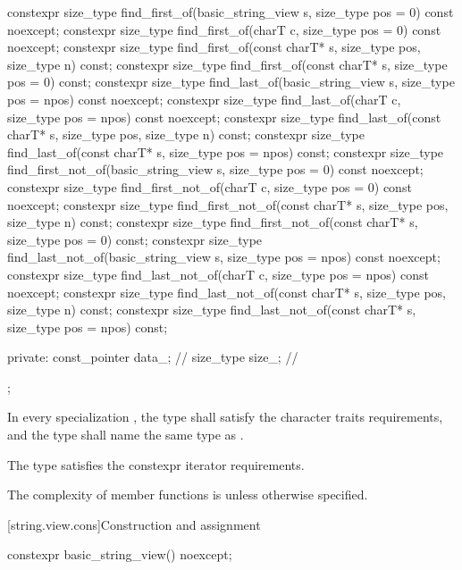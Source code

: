 \begin{codeblock}
{  constexpr size_type find_first_of(basic_string_view s, size_type pos = 0) const noexcept;
  constexpr size_type find_first_of(charT c, size_type pos = 0) const noexcept;
  constexpr size_type find_first_of(const charT* s, size_type pos, size_type n) const;
  constexpr size_type find_first_of(const charT* s, size_type pos = 0) const;
  constexpr size_type find_last_of(basic_string_view s, size_type pos = npos) const noexcept;
  constexpr size_type find_last_of(charT c, size_type pos = npos) const noexcept;
  constexpr size_type find_last_of(const charT* s, size_type pos, size_type n) const;
  constexpr size_type find_last_of(const charT* s, size_type pos = npos) const;
  constexpr size_type find_first_not_of(basic_string_view s, size_type pos = 0) const noexcept;
  constexpr size_type find_first_not_of(charT c, size_type pos = 0) const noexcept;
  constexpr size_type find_first_not_of(const charT* s, size_type pos,
                                        size_type n) const;
  constexpr size_type find_first_not_of(const charT* s, size_type pos = 0) const;
  constexpr size_type find_last_not_of(basic_string_view s,
                                       size_type pos = npos) const noexcept;
  constexpr size_type find_last_not_of(charT c, size_type pos = npos) const noexcept;
  constexpr size_type find_last_not_of(const charT* s, size_type pos,
                                       size_type n) const;
  constexpr size_type find_last_not_of(const charT* s, size_type pos = npos) const;

private:
  const_pointer data_; // \expos
  size_type size_;     // \expos
};
\end{codeblock}

\pnum
In every specialization , the type  shall satisfy the character traits requirements,
and the type  shall name the same type as .

\pnum
The type  satisfies
the constexpr iterator requirements.

\pnum
The complexity of  member functions is 
unless otherwise specified.

[string.view.cons]{Construction and assignment}

%
\begin{itemdecl}
constexpr basic_string_view() noexcept;
\end{itemdecl}

